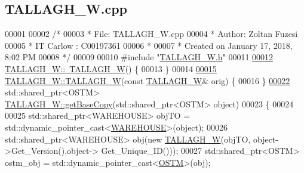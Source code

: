 \hypertarget{_t_a_l_l_a_g_h___w_8cpp_source}{}\subsection{T\+A\+L\+L\+A\+G\+H\+\_\+\+W.\+cpp}

\begin{DoxyCode}
00001 
00002 \textcolor{comment}{/* }
00003 \textcolor{comment}{ * File:   TALLAGH\_W.cpp}
00004 \textcolor{comment}{ * Author: Zoltan Fuzesi}
00005 \textcolor{comment}{ * IT Carlow : C00197361}
00006 \textcolor{comment}{ *}
00007 \textcolor{comment}{ * Created on January 17, 2018, 8:02 PM}
00008 \textcolor{comment}{ */}
00009 
00010 \textcolor{preprocessor}{#include "\hyperlink{_t_a_l_l_a_g_h___w_8h}{TALLAGH\_W.h}"}
00011 
\hypertarget{_t_a_l_l_a_g_h___w_8cpp_source.tex_l00012}{}\hyperlink{class_t_a_l_l_a_g_h___w_aad3a2ca2d942a0629716b1c9f446931f_aad3a2ca2d942a0629716b1c9f446931f}{00012} \hyperlink{class_t_a_l_l_a_g_h___w_aad3a2ca2d942a0629716b1c9f446931f_aad3a2ca2d942a0629716b1c9f446931f}{TALLAGH\_W::~TALLAGH\_W}() \{
00013 \}
00014 
\hypertarget{_t_a_l_l_a_g_h___w_8cpp_source.tex_l00015}{}\hyperlink{class_t_a_l_l_a_g_h___w_a92cfa48ee385c9299427e4fa95b57003_a92cfa48ee385c9299427e4fa95b57003}{00015} \hyperlink{class_t_a_l_l_a_g_h___w_aeafc411edee7a3e8bfcc54fa478e2104_aeafc411edee7a3e8bfcc54fa478e2104}{TALLAGH\_W::TALLAGH\_W}(\textcolor{keyword}{const} \hyperlink{class_t_a_l_l_a_g_h___w}{TALLAGH\_W}& orig) \{
00016 \}
\hypertarget{_t_a_l_l_a_g_h___w_8cpp_source.tex_l00022}{}\hyperlink{class_t_a_l_l_a_g_h___w_a51957c778c31d56f98febdf294f88a4c_a51957c778c31d56f98febdf294f88a4c}{00022} std::shared\_ptr<OSTM> \hyperlink{class_t_a_l_l_a_g_h___w_a51957c778c31d56f98febdf294f88a4c_a51957c778c31d56f98febdf294f88a4c}{TALLAGH\_W::getBaseCopy}(std::shared\_ptr<OSTM> \textcolor{keywordtype}{object})
00023 \{
00024 
00025     std::shared\_ptr<WAREHOUSE> objTO = std::dynamic\_pointer\_cast<\hyperlink{class_w_a_r_e_h_o_u_s_e}{WAREHOUSE}>(object);
00026     std::shared\_ptr<WAREHOUSE> obj(\textcolor{keyword}{new} \hyperlink{class_t_a_l_l_a_g_h___w_aeafc411edee7a3e8bfcc54fa478e2104_aeafc411edee7a3e8bfcc54fa478e2104}{TALLAGH\_W}(objTO, object->Get\_Version(),\textcolor{keywordtype}{object}->
      Get\_Unique\_ID()));
00027     std::shared\_ptr<OSTM> ostm\_obj = std::dynamic\_pointer\_cast<\hyperlink{class_o_s_t_m}{OSTM}>(obj);                             
           

\end{DoxyCode}
